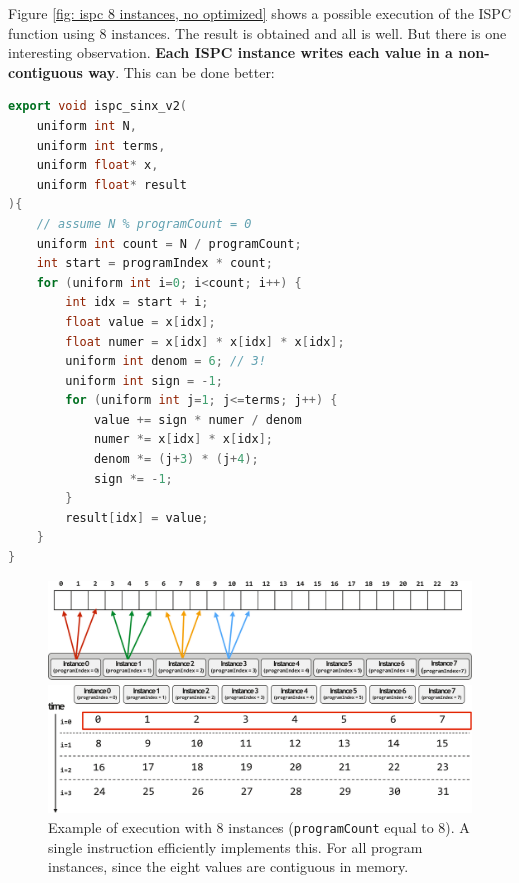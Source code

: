 \noindent
Figure \ref{fig: ispc 8 instances, no optimized} shows a possible execution of the ISPC function using 8 instances. The result is obtained and all is well. But there is one interesting observation. \textbf{Each ISPC instance writes each value in a non-contiguous way}. This can be done better:
\begin{lstlisting}[language=c++, mathescape]
export void ispc_sinx_v2(
    uniform int N,
    uniform int terms,
    uniform float* x,
    uniform float* result
){
    // assume N % programCount = 0
    uniform int count = N / programCount;
    int start = programIndex * count;
    for (uniform int i=0; i<count; i++) {
        int idx = start + i;
        float value = x[idx];
        float numer = x[idx] * x[idx] * x[idx];
        uniform int denom = 6; // 3!
        uniform int sign = -1;
        for (uniform int j=1; j<=terms; j++) { 
            value += sign * numer / denom
            numer *= x[idx] * x[idx];
            denom *= (j+3) * (j+4);
            sign *= -1;
        }
        result[idx] = value;
    }
}
\end{lstlisting}
\newpage
\begin{figure}[!htp]
    \centering
    \includegraphics[width=\textwidth]{img/ispc-3.pdf}
    \begin{center}
        \includegraphics[width=\textwidth]{img/ispc-4.pdf}
    \end{center}
    \caption{Example of execution with 8 instances (\texttt{programCount} equal to 8). A single  instruction efficiently implements this. For all program instances, since the eight values are contiguous in memory.}
\end{figure}